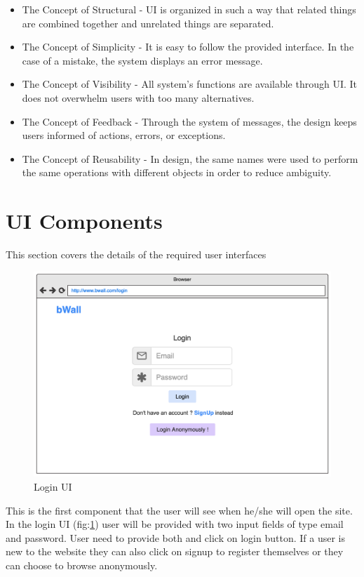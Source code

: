 \documentclass[12pt]{report}
\begin{document}
\begin{itemize}
    \item The Concept of Structural - UI is organized in such a way that related things are combined together and unrelated things are separated.
    \item The Concept of Simplicity - It is easy to follow the provided interface. In the case of a mistake, the system displays an error message.
    \item The Concept of Visibility - All system’s functions are available through UI. It does not overwhelm users with too many alternatives.
    \item The Concept of Feedback - Through the system of messages, the design keeps users informed of actions, errors, or exceptions.
    \item The Concept of Reusability - In design, the same names were used to perform the same operations with different objects in order to reduce ambiguity.
\end{itemize}

\section{UI Components}
This section covers the details of the required user interfaces 

\begin{figure}[H]
\centering
\includegraphics[width=12cm]{uilogin.png}
\caption{Login UI}
\label{fig:loginui}
\end{figure}
This is the first component that the user will see when he/she will open the site. In the login UI (fig:\ref{fig:loginui}) user will be provided with two input fields of type email and password. User need to provide both and click on login button. If a user is new to the website they can also click on signup to register themselves or they can choose to browse anonymously.
\end{document}
